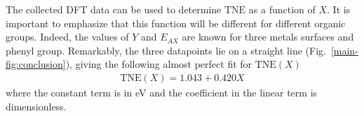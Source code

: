 \documentclass[aps,prl,reprint,amsmath,amssymb,floatfix,notitlepage]{revtex4-1}
\begin{document}
The collected DFT data can be used to determine $\text{TNE}$ as a function of $X$. It is important to emphasize that this function will be different for different organic groups. Indeed, the values of $Y$ and $E_{AX}$ are known for three metals surfaces and phenyl group. Remarkably, the three datapoints lie on a straight line (Fig.~\ref{main-fig:conclusion}), giving the following almost perfect fit for $\text{TNE}(X)$
%
\begin{equation} \label{eq:TNEfit}
\begin{split}
\text{TNE}(X) = 1.043 + 0.420 X
\end{split}
\end{equation}
%
where the constant term is in \si{\electronvolt} and the coefficient in the linear term is dimensionless. 


\end{document}
